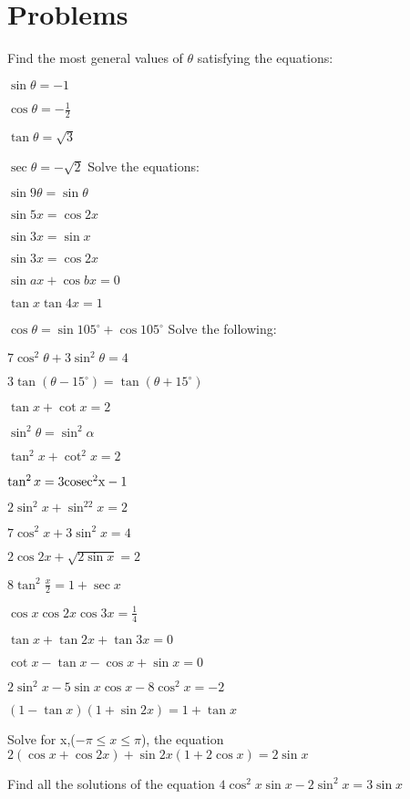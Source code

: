 \section{Problems}
Find the most general values of $\theta$ satisfying the equations:
\startitemize[n, 1*broad]
\item $\sin\theta = -1$
\item $\cos\theta = -\frac{1}{2}$
\item $\tan\theta = \sqrt{3}$
\item $\sec\theta = -\sqrt{2}$
\stopitemize
Solve the equations:
\item $\sin9\theta = \sin\theta$
\item $\sin5x = \cos2x$
\item $\sin3x = \sin x$
\item $\sin3x = \cos2x$
\item $\sin ax + \cos bx = 0$
\item $\tan x\tan4x = 1$
\item $\cos\theta = \sin105^\circ + \cos 105^\circ$
\stopitemize
Solve the following:
\item $7\cos^2\theta + 3\sin^2\theta = 4$
\item $3\tan(\theta - 15^\circ) = \tan(\theta + 15^\circ)$
\item $\tan x + \cot x = 2$
\item $\sin^2\theta = \sin^2\alpha$
\item $\tan^2x + \cot^2x = 2$
\item $\tan^2x = 3\rm cosec^2x - 1$
\item $2\sin^2x + \sin^22x = 2$
\item $7\cos^2x + 3\sin^2x = 4$
\item $2\cos2x + \sqrt{2\sin x} = 2$
\item $8\tan^2\frac{x}{2} = 1 + \sec x$
\item $\cos x\cos2x\cos3x = \frac{1}{4}$
\item $\tan x + \tan2x + \tan3x = 0$
\item $\cot x - \tan x - \cos x + \sin x = 0$
\item $2\sin^2x - 5\sin x\cos x - 8\cos^2x = -2$
\item $(1 - \tan x)(1 + \sin2x) = 1 + \tan x$
\item Solve for x,($-\pi \leq x \leq \pi$), the equation $2(\cos x + \cos2x) + \sin2x(1 + 2\cos x) = 2\sin x$
\item Find all the solutions of the equation $4\cos^2x\sin x - 2\sin^2x = 3\sin x$

